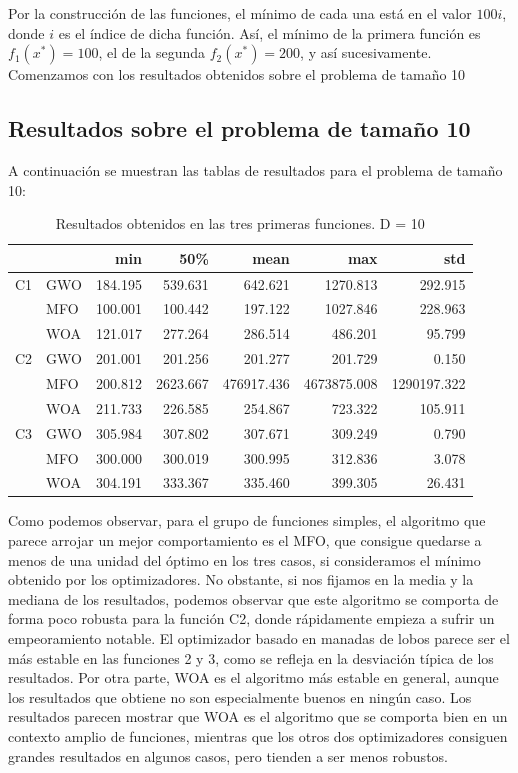 \documentclass[
  a4paper,
,tablecaptionabove
]{scrartcl}
\begin{document}
Por la construcción de las funciones, el mínimo de cada una está en el
valor \(100i\), donde \(i\) es el índice de dicha función. Así, el
mínimo de la primera función es \(f_1(x^*) = 100\), el de la segunda
\(f_2(x^*) = 200\), y así sucesivamente. Comenzamos con los resultados
obtenidos sobre el problema de tamaño 10

\hypertarget{resultados-sobre-el-problema-de-tamauxf1o-10}{%
\subsection{Resultados sobre el problema de tamaño
10}\label{resultados-sobre-el-problema-de-tamauxf1o-10}}

A continuación se muestran las tablas de resultados para el problema de
tamaño 10:

\begin{longtable}{llrrrrr}
\caption{Resultados obtenidos en las tres primeras funciones. D = 10}\\
\toprule
   &     &     min &      50\% &       mean &         max &         std \\
\midrule
C1 & GWO & 184.195 &  539.631 &    642.621 &    1270.813 &     292.915 \\
   & MFO & 100.001 &  100.442 &    197.122 &    1027.846 &     228.963 \\
   & WOA & 121.017 &  277.264 &    286.514 &     486.201 &      95.799 \\
\midrule
C2 & GWO & 201.001 &  201.256 &    201.277 &     201.729 &       0.150 \\
   & MFO & 200.812 & 2623.667 & 476917.436 & 4673875.008 & 1290197.322 \\
   & WOA & 211.733 &  226.585 &    254.867 &     723.322 &     105.911 \\
\midrule
C3 & GWO & 305.984 &  307.802 &    307.671 &     309.249 &       0.790 \\
   & MFO & 300.000 &  300.019 &    300.995 &     312.836 &       3.078 \\
   & WOA & 304.191 &  333.367 &    335.460 &     399.305 &      26.431 \\
\bottomrule
\end{longtable}

Como podemos observar, para el grupo de funciones simples, el algoritmo
que parece arrojar un mejor comportamiento es el MFO, que consigue
quedarse a menos de una unidad del óptimo en los tres casos, si
consideramos el mínimo obtenido por los optimizadores. No obstante, si
nos fijamos en la media y la mediana de los resultados, podemos observar
que este algoritmo se comporta de forma poco robusta para la función C2,
donde rápidamente empieza a sufrir un empeoramiento notable. El
optimizador basado en manadas de lobos parece ser el más estable en las
funciones 2 y 3, como se refleja en la desviación típica de los
resultados. Por otra parte, WOA es el algoritmo más estable en general,
aunque los resultados que obtiene no son especialmente buenos en ningún
caso. Los resultados parecen mostrar que WOA es el algoritmo que se
comporta bien en un contexto amplio de funciones, mientras que los otros
dos optimizadores consiguen grandes resultados en algunos casos, pero
tienden a ser menos robustos.
\end{document}

